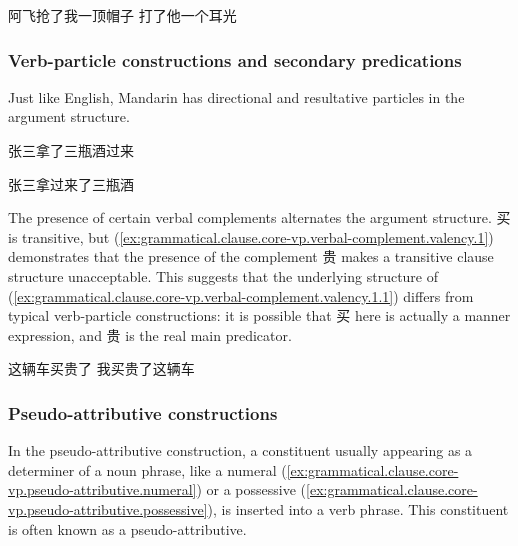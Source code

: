 \documentclass[UTF8, a4paper, oneside, scheme=plain, 12pt]{ctexrep}
\begin{document}
\begin{exe}
    \ex\label{ex:grammatical.clause.core-vp.valency.do-affect-patient.1} 阿飞抢了我一顶帽子
    \ex\label{ex:grammatical.clause.core-vp.valency.do-affect-patient.2} 打了他一个耳光
\end{exe}

\subsubsection{Verb-particle constructions and secondary predications}\label{sec:grammatical.clause.core-vp.particles}

Just like English, Mandarin has directional and resultative particles in the argument structure.

\begin{exe}
    \ex 张三拿了三瓶酒过来
\end{exe}

\begin{exe}
    \ex 张三拿过来了三瓶酒
\end{exe}

The presence of certain verbal complements alternates the argument structure.
买 is transitive, but (\ref{ex:grammatical.clause.core-vp.verbal-complement.valency.1})
demonstrates that the presence of the complement 贵 makes 
a transitive clause structure unacceptable.
This suggests that the underlying structure of (\ref{ex:grammatical.clause.core-vp.verbal-complement.valency.1.1})
differs from typical verb-particle constructions:
it is possible that 买 here is actually a manner expression,
and 贵 is the real main predicator.

\begin{exe}
    \ex\label{ex:grammatical.clause.core-vp.verbal-complement.valency.1} 
    \begin{xlist}
        \ex\label{ex:grammatical.clause.core-vp.verbal-complement.valency.1.1} 这辆车买贵了
        \ex *我买贵了这辆车
    \end{xlist}
\end{exe}

\subsubsection{Pseudo-attributive constructions}\label{sec:grammatical.clause.core-vp.pseudo-attributive}

In the pseudo-attributive construction,
a constituent usually appearing as a determiner of a noun phrase, 
like a numeral (\ref{ex:grammatical.clause.core-vp.pseudo-attributive.numeral})
or a possessive (\ref{ex:grammatical.clause.core-vp.pseudo-attributive.possessive}),
is inserted into a verb phrase.
This constituent is often known as a pseudo-attributive.
\end{document}
